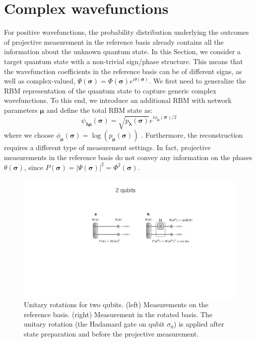 \documentclass[submission, Phys, hidelnks]{SciPost}
\begin{document}
\section{Complex wavefunctions}
\label{sec:complex}
For positive wavefunctions, the probability distribution underlying the outcomes of projective measurement in the reference basis already contains all the information about the unknown quantum state. In this Section, we consider a target quantum state with a non-trivial sign/phase structure. This means that the wavefunction coefficients in the reference basis can be of different signs, as well as complex-valued, $\Psi(\bm{\sigma})=\Phi(\bm{\sigma})e^{i\theta(\bm{\sigma})}$. We first need to generalize the RBM representation of the quantum state to capture generic complex wavefunctions. To this end, we introduce an additional RBM with network parameters $\bm{\mu}$ and define the total RBM state as:
\begin{equation}
    \psi_{\bm{\lambda} \bm{\mu}} (\bm{\sigma})= \sqrt{p_{\bm{\lambda}} (\bm{\sigma})} e^{i \phi_{\bm{\mu}} (\bm{\sigma})/2}
\end{equation}
where we choose $\phi_{\bm{\mu}}(\bm{\sigma}) = \log (p_{\bm{\mu}} (\bm{\sigma}))$ \cite{torlai2018tomography}. Furthermore, the reconstruction requires a different type of measurement settings. In fact, projective measurements in the reference basis do not convey any information on the phases $\theta(\bm{\sigma})$, since $P(\bm{\sigma})=|\Psi(\bm{\sigma})|^2=\Phi^2(\bm{\sigma})$.

\begin{figure}[htb]
    \centering
    \includegraphics[width=\columnwidth, trim={0 0 0 40}, clip]{2qubits_rotation}
    \caption{Unitary rotations for two qubits. (left) Measurements on the reference basis. (right) Measurement in the rotated basis. The unitary rotation (the Hadamard gate on qubit $\sigma_0$) is applied after state preparation and before the projective measurement.}
    \label{phase_learn} 
\end{figure}
\end{document}
